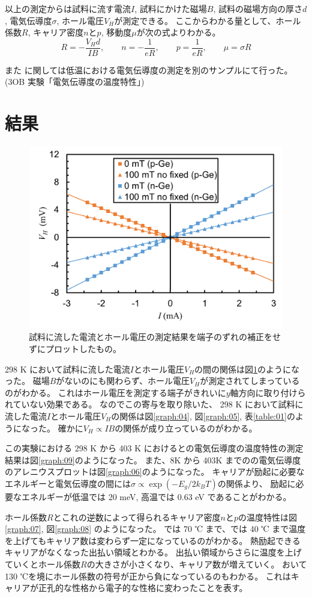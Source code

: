 \documentclass[11pt,dvipdfmx,a4paper]{jsarticle}
\numberwithin{equation}{section}
\begin{document}
以上の測定からは試料に流す電流\(I\), 試料にかけた磁場\(B\), 試料の磁場方向の厚さ\(d\),
電気伝導度\(\sigma\), ホール電圧\(V_H\)が測定できる。
ここからわかる量として、ホール係数\(R\), キャリア密度\(n\)と\(p\), 移動度\(\mu\)が次の式よりわかる。
\begin{equation}
	R = - \frac{V_H d}{IB}, \qquad
	n = - \frac{1}{eR}, \qquad p = \frac{1}{eR}, \qquad
	\mu = \sigma R
\end{equation}

また に関しては低温における電気伝導度の測定を別のサンプルにて行った。(3OB 実験「電気伝導度の温度特性」)


\section{結果}

\begin{figure}
	\centering
	\includegraphics[width=0.4\columnwidth]{graph/graph03.png}
	\caption{試料に流した電流とホール電圧の測定結果を端子のずれの補正をせずにプロットしたもの。}
	\label{graph:03}
\end{figure}
298 K において試料に流した電流\(I\)とホール電圧\(V_H\)の間の関係は図\ref{graph:03}のようになった。
磁場\(B\)がないのにも関わらず、ホール電圧\(V_H\)が測定されてしまっているのがわかる。
これはホール電圧を測定する端子がきれいに\(y\)軸方向に取り付けられていない効果である。
なのでこの寄与を取り除いた、
298 K において試料に流した電流\(I\)とホール電圧\(V_H\)の関係は図\ref{graph:04}, 図\ref{graph:05}, 表\ref{table:01}のようになった。
確かに\(V_H \propto IB\)の関係が成り立っているのがわかる。

この実験における 298 K から 403 K におけるとの電気伝導度の温度特性の測定結果は図\ref{graph:09}のようになった。
また、8K から 403K までのの電気伝導度のアレニウスプロットは図\ref{graph:06}のようになった。
キャリアが励起に必要なエネルギーと電気伝導度の間には\(\sigma\propto \exp(-E_g/2k_B T)\)の関係より、
励起に必要なエネルギーが低温では 20 meV, 高温では 0.63 eV であることがわかる。

ホール係数\(R\)とこれの逆数によって得られるキャリア密度\(n\)と\(p\)の温度特性は図\ref{graph:07}, 図\ref{graph:08} のようになった。
 では 70 ℃ まで、では 40 ℃ まで温度を上げてもキャリア数は変わらず一定になっているのがわかる。
熱励起できるキャリアがなくなった出払い領域とわかる。
出払い領域からさらに温度を上げていくとホール係数\(R\)の大きさが小さくなり、キャリア数が増えていく。
おいて 130 ℃を境にホール係数の符号が正から負になっているのもわかる。
これはキャリアが正孔的な性格から電子的な性格に変わったことを表す。
\end{document}
